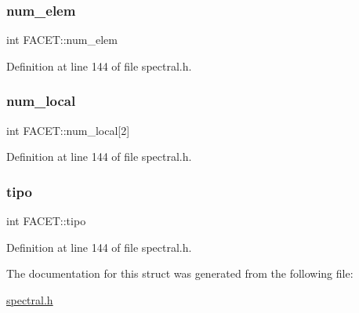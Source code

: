 \subsubsection{\texorpdfstring{num\+\_\+elem}{num\_elem}}
{\footnotesize\ttfamily int F\+A\+C\+E\+T\+::num\+\_\+elem}



Definition at line 144 of file spectral.\+h.

\mbox{\label{structFACET_aaa220aa7501d31db6642086cad9a9720}} 
\subsubsection{\texorpdfstring{num\+\_\+local}{num\_local}}
{\footnotesize\ttfamily int F\+A\+C\+E\+T\+::num\+\_\+local\mbox{[}2\mbox{]}}



Definition at line 144 of file spectral.\+h.

\mbox{\label{structFACET_a381c8d10600889596aaf599d5646f18b}} 
\subsubsection{\texorpdfstring{tipo}{tipo}}
{\footnotesize\ttfamily int F\+A\+C\+E\+T\+::tipo}



Definition at line 144 of file spectral.\+h.



The documentation for this struct was generated from the following file\+:\begin{DoxyCompactItemize}
\item 
\hyperlink{spectral_8h}{spectral.\+h}\end{DoxyCompactItemize}
